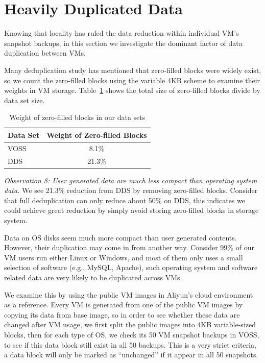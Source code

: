 \section{Heavily Duplicated Data}
\label{sect:dup}
Knowing that locality has ruled the 
data reduction within individual VM's snapshot backups,
in this section we investigate the dominant factor
of data duplication between VMs. 

Many deduplication study has mentioned that zero-filled
blocks were widely exist, so we count the
zero-filled blocks using the variable 4KB scheme to examine their weights in VM storage.
Table~\ref{tab:zero} shows the total size of zero-filled
blocks divide by data set size.

\begin{table}[htb]
  \centering
    \begin{tabular}{|l|c|}
        \hline
        Data Set & Weight of Zero-filled Blocks\\ \hline
        VOSS & 8.1\% \\ \hline
        DDS & 21.3\% \\
        \hline
    \end{tabular}
    \caption{Weight of zero-filled blocks in our data sets}
    \label{tab:zero}
\end{table}

\emph{Observation 8: User generated data are much less compact than operating system data.}
We see 21.3\% reduction from DDS by removing zero-filled blocks. Consider
that full deduplication can only reduce about 50\% on DDS, this indicates we could
achieve great reduction by simply avoid storing zero-filled blocks in storage system.

Data on OS disks seem much more compact than
user generated contents. However, their duplication may come in from another way.
Consider 99\% of our VM users run either Linux or Windows, and most of them only uses
a small selection of software (e.g., MySQL, Apache), such
operating system and software related data are very likely to be duplicated
across VMs.

We examine this by using the public VM images in Aliyun's cloud environment as a reference.
Every VM is generated from one of the public VM images by copying its data from base image,
so in order to see whether these data are changed after VM usage,
we first split the public images into 4KB variable-sized blocks, then for each type of
OS, we check its 50 VM snapshot backups in VOSS, to see if this data block still exist in all
50 backups. This is a very strict criteria, a data block will only be marked as ``unchanged''
if it appear in all 50 snapshots.


